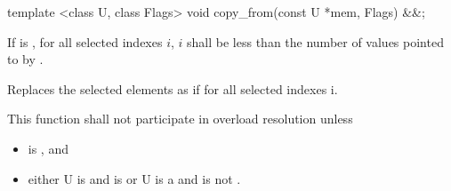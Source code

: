 \begin{itemdecl}
template <class U, class Flags> void copy_from(const U *mem, Flags) &&;
\end{itemdecl}
\begin{itemdescr}
  If  is \true, for all selected indexes $i$, $i$ shall be less than the number of values pointed to by .

  \pnum\effects Replaces the selected elements as if  for all selected indexes \code i.

  \pnum\remarks This function shall not participate in overload resolution unless
  \begin{itemize}
      \item {} is \true, and
      \item either \type U is \bool and  is \bool or
          \type U is a \realArithmeticType and  is not \bool.
  \end{itemize}
\end{itemdescr}

